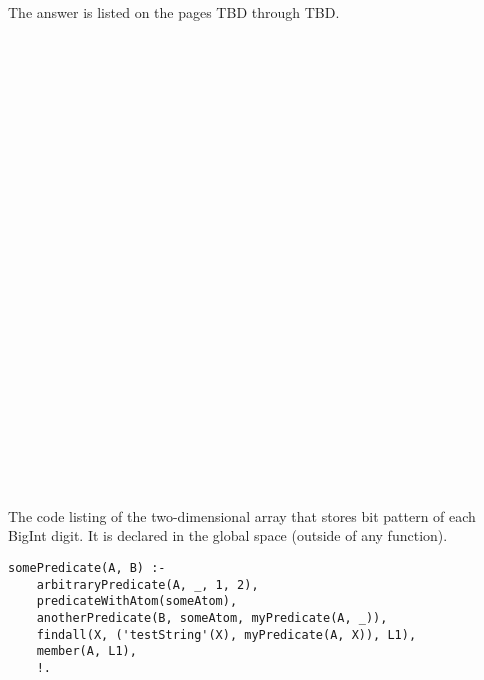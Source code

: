 \documentclass{article}
\begin{document}
	The answer is listed on the pages TBD through TBD.
	
	
\paragraph{}\
\paragraph{}\
\paragraph{}\
\paragraph{}\
\paragraph{}\
\paragraph{}\
\paragraph{}\
\paragraph{}\
\paragraph{}\
\paragraph{}\
\paragraph{}\
\paragraph{}\

	
	\noindent The code listing of the two-dimensional array that stores bit pattern of each BigInt digit. It is declared in the global space (outside of any function).
	
	\begin{verbatim}
somePredicate(A, B) :-
    arbitraryPredicate(A, _, 1, 2),
    predicateWithAtom(someAtom),
    anotherPredicate(B, someAtom, myPredicate(A, _)),
    findall(X, ('testString'(X), myPredicate(A, X)), L1),
    member(A, L1),
    !.
	\end{verbatim}
	
\end{document}
